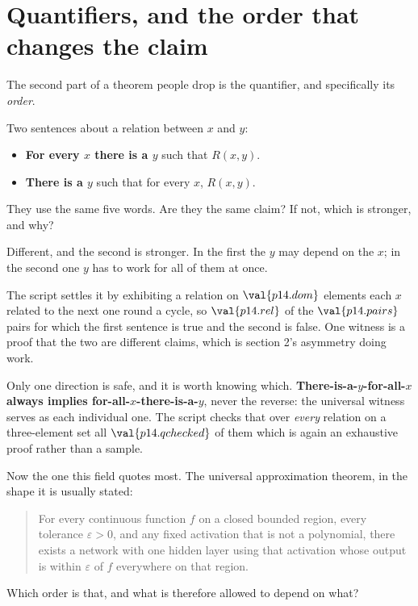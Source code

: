 \section{Quantifiers, and the order that changes the claim}
\label{sec:P14-quantifiers}

\begin{fr}
The second part of a theorem people drop is the quantifier, and specifically
its \emph{order}.

Two sentences about a relation between $x$ and $y$:

\begin{itemize}
\item \textbf{For every $x$ there is a $y$} such that $R(x,y)$.
\item \textbf{There is a $y$} such that for every $x$, $R(x,y)$.
\end{itemize}

They use the same five words. Are they the same claim? If not, which is
stronger, and why?
\dotline
\nextframe
\end{fr}

\begin{fr}
\begin{ansblock}
Different, and the second is stronger. In the first the $y$ may depend on the
$x$; in the second one $y$ has to work for all of them at once.
\end{ansblock}

The script settles it by exhibiting a relation on $\val{p14.dom}$ elements
\dash{} each $x$ related to the next one round a cycle, so
$\val{p14.rel}$ of the $\val{p14.pairs}$ pairs \dash{} for which the first
sentence is true and the second is false. One witness is a proof that the two
are different claims, which is section 2's asymmetry doing work.

\begin{note}
Only one direction is safe, and it is worth knowing which.
\textbf{There-is-a-$y$-for-all-$x$ always implies
for-all-$x$-there-is-a-$y$}, never the reverse:
the universal witness serves as each individual one. The script checks that
over \emph{every} relation on a three-element set \dash{} all
$\val{p14.qchecked}$ of them \dash{} which is again an exhaustive proof rather
than a sample.
\end{note}
\end{fr}

\begin{fr}
Now the one this field quotes most. The universal approximation theorem, in
the shape it is usually stated:

\begin{quote}
For every continuous function $f$ on a closed bounded region, every
tolerance $\varepsilon > 0$, and any fixed activation that is not a
polynomial, there exists a network with one hidden layer using that
activation whose output is within $\varepsilon$ of $f$ everywhere on that
region.
\end{quote}

Which order is that, and what is therefore allowed to depend on what?
\dotline
\nextframe
\end{fr}

